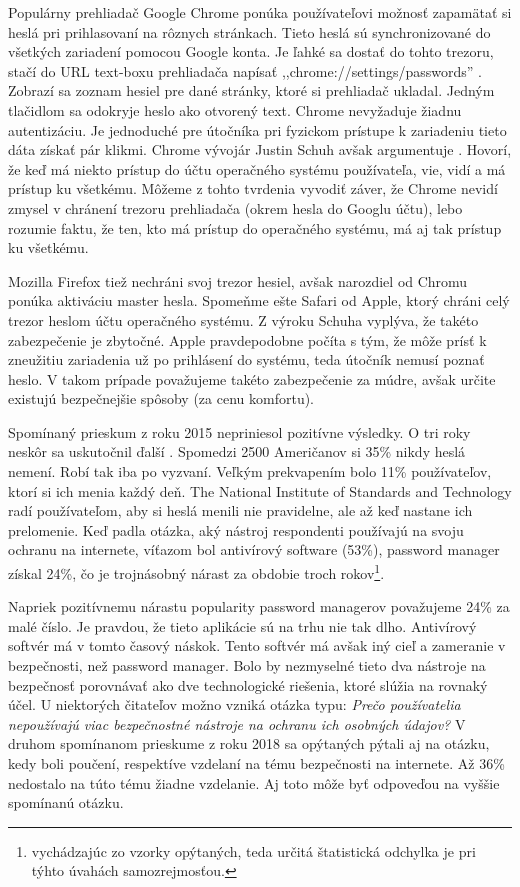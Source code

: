 \par Populárny prehliadač Google Chrome ponúka používateľovi možnosť zapamätať si heslá pri prihlasovaní na rôznych stránkach. Tieto heslá sú synchronizované do všetkých zariadení pomocou Google konta. Je ľahké sa dostať do tohto trezoru, stačí do URL text-boxu prehliadača napísať ,,chrome://settings/passwords'' \cite{21}. Zobrazí sa zoznam hesiel pre dané stránky, ktoré si prehliadač ukladal. Jedným tlačidlom sa odokryje heslo ako otvorený text. Chrome nevyžaduje žiadnu autentizáciu. Je jednoduché pre útočníka pri fyzickom prístupe k zariadeniu tieto dáta získať pár klikmi. Chrome vývojár Justin Schuh avšak argumentuje \cite{21}. Hovorí, že keď má niekto prístup do účtu operačného systému používateľa, vie, vidí a má prístup ku všetkému. Môžeme z tohto tvrdenia vyvodiť záver, že Chrome nevidí zmysel v chránení trezoru prehliadača (okrem hesla do Googlu účtu), lebo rozumie faktu, že ten, kto má prístup do operačného systému, má aj tak prístup ku všetkému.
\par Mozilla Firefox tiež nechráni svoj trezor hesiel, avšak narozdiel od Chromu ponúka aktiváciu master hesla. Spomeňme ešte Safari od Apple, ktorý chráni celý trezor heslom účtu operačného systému. Z výroku Schuha vyplýva, že takéto zabezpečenie je zbytočné. Apple pravdepodobne počíta s tým, že môže prísť k zneužitiu zariadenia už po prihlásení do systému, teda útočník nemusí poznať heslo. V takom prípade považujeme takéto zabezpečenie za múdre, avšak určite existujú bezpečnejšie spôsoby (za cenu komfortu).
\par Spomínaný prieskum z roku 2015 nepriniesol pozitívne výsledky. O tri roky neskôr sa uskutočnil ďalší \cite{22}. Spomedzi 2500 Američanov si 35\% nikdy heslá nemení. Robí tak iba po vyzvaní. Veľkým prekvapením bolo 11\% používateľov, ktorí si ich menia každý deň. The National Institute of Standards and Technology radí používateľom, aby si heslá menili nie pravidelne, ale až keď nastane ich prelomenie. Keď padla otázka, aký nástroj respondenti používajú na svoju ochranu na internete, víťazom bol antivírový software (53\%), password manager získal 24\%, čo je trojnásobný nárast za obdobie troch rokov\footnote{vychádzajúc zo vzorky opýtaných, teda určitá štatistická odchylka je pri týhto úvahách samozrejmosťou.}.
\par Napriek pozitívnemu nárastu popularity password managerov považujeme 24\% za malé číslo. Je pravdou, že tieto aplikácie sú na trhu nie tak dlho. Antivírový softvér má v tomto časový náskok. Tento softvér má avšak iný cieľ a zameranie v bezpečnosti, než password manager. Bolo by nezmyselné tieto dva nástroje na bezpečnosť porovnávať ako dve technologické riešenia, ktoré slúžia na rovnaký účel. U niektorých čitateľov možno vzniká otázka typu: \textit{Prečo používatelia nepoužívajú viac bezpečnostné nástroje na ochranu ich osobných údajov?} V druhom spomínanom prieskume z roku 2018 sa opýtaných pýtali aj na otázku, kedy boli poučení, respektíve vzdelaní na tému bezpečnosti na internete. Až 36\% nedostalo na túto tému žiadne vzdelanie. Aj toto môže byť odpoveďou na vyššie spomínanú otázku.
